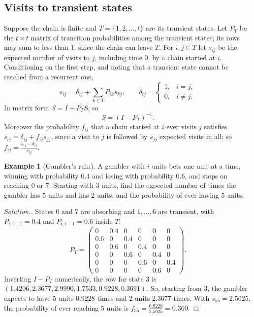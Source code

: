 \documentclass[12pt,a4paper]{report}
\theoremstyle{definition}
\newtheorem{exa}[thm]{Example}
\newenvironment{solution}
  {\renewcommand{\qedsymbol}{}\begin{proof}[\textit{Solution}.]}
  {\end{proof}}
\begin{document}
\subsection{Visits to transient states}

Suppose the chain is finite and $T = \{1, 2, \dots, t\}$ are its transient states. Let $P_T$ be the
$t\times t$ matrix of transition probabilities among the transient states; its rows may sum to
less than $1$, since the chain can leave $T$. For $i, j\in T$ let $s_{ij}$ be the expected number
of visits to $j$, including time $0$, by a chain started at $i$. Conditioning on the first step,
and noting that a transient state cannot be reached from a recurrent one,
\[s_{ij} = \delta_{ij} + \sum_{k\in T}P_{ik}s_{kj},\qquad \delta_{ij} = \begin{cases}1, & i = j,\\ 0, & i\ne j .\end{cases}\]
In matrix form $S = I + P_TS$, so
\[S = (I - P_T)^{-1} .\]
Moreover the probability $f_{ij}$ that a chain started at $i$ ever visits $j$ satisfies
$s_{ij} = \delta_{ij} + f_{ij}s_{jj}$, since a visit to $j$ is followed by $s_{jj}$ expected visits in
all; so $f_{ij} = \frac{s_{ij} - \delta_{ij}}{s_{jj}}$.

\begin{exa}[Gambler's ruin]
\label{ex:gamblersruin}
A gambler with $i$ units bets one unit at a time, winning with probability $0.4$ and losing
with probability $0.6$, and stops on reaching $0$ or $7$. Starting with $3$ units, find the expected
number of times the gambler has $5$ units and has $2$ units, and the probability of ever having
$5$ units.
\end{exa}

\begin{solution}
States $0$ and $7$ are absorbing and $1, \dots, 6$ are transient, with $P_{i,i + 1} = 0.4$ and
$P_{i,i - 1} = 0.6$ inside $T$:
\[P_T = \begin{pmatrix}
0 & 0.4 & 0 & 0 & 0 & 0\\
0.6 & 0 & 0.4 & 0 & 0 & 0\\
0 & 0.6 & 0 & 0.4 & 0 & 0\\
0 & 0 & 0.6 & 0 & 0.4 & 0\\
0 & 0 & 0 & 0.6 & 0 & 0.4\\
0 & 0 & 0 & 0 & 0.6 & 0
\end{pmatrix}.\]
Inverting $I - P_T$ numerically, the row for state $3$ is
$(1.4206, 2.3677, 2.9990, 1.7533, 0.9228, 0.3691)$. So, starting from $3$, the gambler expects
to have $5$ units $0.9228$ times and $2$ units $2.3677$ times. With $s_{55} = 2.5625$, the
probability of ever reaching $5$ units is $f_{35} = \frac{0.9228}{2.5625} = 0.360$.
\end{solution}
\end{document}
